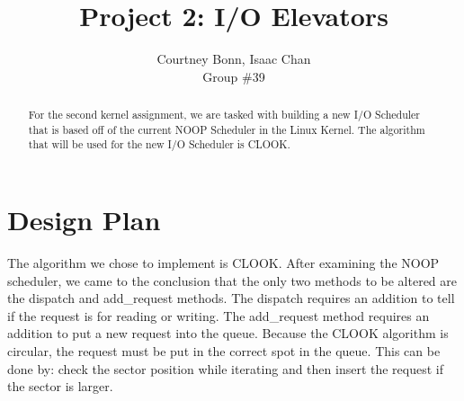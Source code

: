 \documentclass[letterpaper,10pt,draftclsnofoot,onecolumn,titlepage]{IEEEtran}
\def\name{Courtney Bonn, Isaac Chan}
\def\grp{Group \#39}
\begin{document}
\title{Project 2: I/O Elevators}
\author{\name \\ \grp}

\maketitle

\begin{abstract}
For the second kernel assignment, we are tasked with building a new I/O Scheduler that is based off of the current NOOP Scheduler in the Linux Kernel. 
The algorithm that will be used for the new I/O Scheduler is CLOOK. 
\end{abstract}

\section{Design Plan}
The algorithm we chose to implement is CLOOK. After examining the NOOP scheduler, we came to the conclusion that the only two methods to be altered 
are the dispatch and add\_request methods. The dispatch requires an addition to tell if the request is for reading or writing. The add\_request method 
requires an addition to put a new request into the queue. Because the CLOOK algorithm is circular, the request must be put in the correct spot in the 
queue. This can be done by: check the sector position while iterating and then insert the request if the sector is larger. 
    
\end{document}
